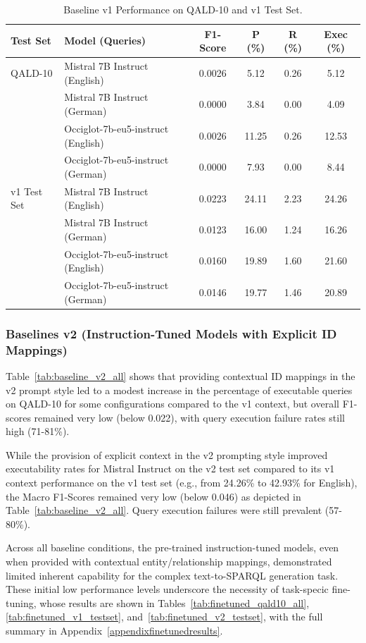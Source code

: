 \begin{table}[htbp]
\centering
\caption{Baseline v1 Performance on QALD-10 and v1 Test Set.}
\label{tab:baseline_v1_all}
\begin{tabular}{@{}llcccc@{}}
\toprule
\textbf{Test Set} & \textbf{Model (Queries)} & \textbf{F1-Score} & \textbf{P (\%)} & \textbf{R (\%)} & \textbf{Exec (\%)} \\
\midrule
QALD-10 & Mistral 7B Instruct (English) & 0.0026 & 5.12 & 0.26 & 5.12 \\
& Mistral 7B Instruct (German) & 0.0000 & 3.84 & 0.00 & 4.09 \\
& Occiglot-7b-eu5-instruct (English) & 0.0026 & 11.25 & 0.26 & 12.53 \\
& Occiglot-7b-eu5-instruct (German) & 0.0000 & 7.93 & 0.00 & 8.44 \\
\midrule
v1 Test Set & Mistral 7B Instruct (English) & 0.0223 & 24.11 & 2.23 & 24.26 \\
& Mistral 7B Instruct (German) & 0.0123 & 16.00 & 1.24 & 16.26 \\
& Occiglot-7b-eu5-instruct (English) & 0.0160 & 19.89 & 1.60 & 21.60 \\
& Occiglot-7b-eu5-instruct (German) & 0.0146 & 19.77 & 1.46 & 20.89 \\
\bottomrule
\end{tabular}
\end{table}

\subsubsection{Baselines v2 (Instruction-Tuned Models with Explicit ID Mappings)}\label{sec:baseline_v2_context}
Table~\ref{tab:baseline_v2_all} shows that providing contextual ID mappings in the v2 prompt style led to a modest increase in the
percentage of executable queries on QALD-10 for some configurations compared to the
v1 context, but overall F1-scores remained very low (below 0.022), with query execution
failure rates still high (71-81\%).

While the provision of explicit context in the v2 prompting style improved executability rates for Mistral Instruct on the v2 test set compared to its v1 context performance on the v1 test set (e.g., from 24.26\% to 42.93\% for English), the Macro F1-Scores remained very low (below 0.046) as depicted in Table~\ref{tab:baseline_v2_all}. 
Query execution failures were still prevalent (57-80\%).

Across all baseline conditions, the pre-trained instruction-tuned models, even when
provided with contextual entity/relationship mappings, demonstrated limited inherent
capability for the complex text-to-SPARQL generation task. These initial low performance
levels underscore the necessity of task-specic fine-tuning, whose results are shown in Tables~\ref{tab:finetuned_qald10_all}, \ref{tab:finetuned_v1_testset}, and~\ref{tab:finetuned_v2_testset}, with the full summary in Appendix~\ref{appendixfinetunedresults}.

